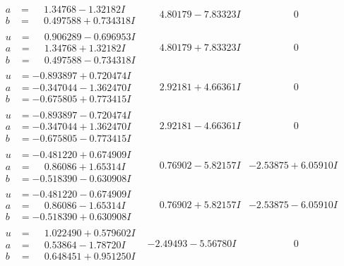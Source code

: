 \documentclass[1p]{elsarticle_modified}
\theoremstyle{definition}
\begin{document}
$$\begin{array}{c|c|c}
\begin{aligned}
a &= \phantom{-}1.34768 - 1.32182 I \\
b &= \phantom{-}0.497588 + 0.734318 I\end{aligned}
 & \phantom{-}4.80179 - 7.83323 I & \phantom{-0.000000 } 0 \\ \hline\begin{aligned}
u &= \phantom{-}0.906289 - 0.696953 I \\
a &= \phantom{-}1.34768 + 1.32182 I \\
b &= \phantom{-}0.497588 - 0.734318 I\end{aligned}
 & \phantom{-}4.80179 + 7.83323 I & \phantom{-0.000000 } 0 \\ \hline\begin{aligned}
u &= -0.893897 + 0.720474 I \\
a &= -0.347044 - 1.362470 I \\
b &= -0.675805 + 0.773415 I\end{aligned}
 & \phantom{-}2.92181 + 4.66361 I & \phantom{-0.000000 } 0 \\ \hline\begin{aligned}
u &= -0.893897 - 0.720474 I \\
a &= -0.347044 + 1.362470 I \\
b &= -0.675805 - 0.773415 I\end{aligned}
 & \phantom{-}2.92181 - 4.66361 I & \phantom{-0.000000 } 0 \\ \hline\begin{aligned}
u &= -0.481220 + 0.674909 I \\
a &= \phantom{-}0.86086 + 1.65314 I \\
b &= -0.518390 - 0.630908 I\end{aligned}
 & \phantom{-}0.76902 - 5.82157 I & -2.53875 + 6.05910 I \\ \hline\begin{aligned}
u &= -0.481220 - 0.674909 I \\
a &= \phantom{-}0.86086 - 1.65314 I \\
b &= -0.518390 + 0.630908 I\end{aligned}
 & \phantom{-}0.76902 + 5.82157 I & -2.53875 - 6.05910 I \\ \hline\begin{aligned}
u &= \phantom{-}1.022490 + 0.579602 I \\
a &= \phantom{-}0.53864 - 1.78720 I \\
b &= \phantom{-}0.648451 + 0.951250 I\end{aligned}
 & -2.49493 - 5.56780 I & \phantom{-0.000000 } 0\\

\end{array}$$
\end{document}
